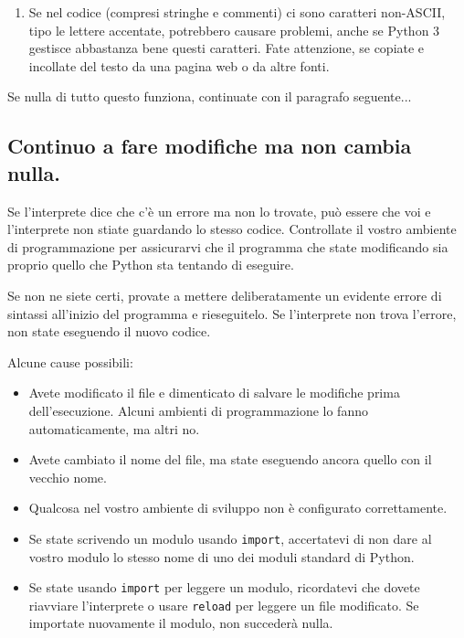 \documentclass[10pt]{book}
\begin{document}
\begin{enumerate}
\item Se nel codice (compresi stringhe e commenti) ci sono caratteri non-ASCII, tipo le lettere accentate, potrebbero causare problemi, anche se Python 3 gestisce abbastanza bene questi caratteri. Fate attenzione, se copiate e incollate del testo da una pagina web o da altre fonti.

\end{enumerate}

Se nulla di tutto questo funziona, continuate con il paragrafo seguente...


\subsection{Continuo a fare modifiche ma non cambia nulla.}

Se l'interprete dice che c'è un errore ma non lo trovate, può essere che voi e l'interprete non stiate guardando lo stesso codice. Controllate il vostro ambiente di programmazione per assicurarvi che il programma che state modificando sia proprio quello che Python sta tentando di eseguire.

Se non ne siete certi, provate a mettere deliberatamente un evidente errore di sintassi all'inizio del programma e rieseguitelo. Se l'interprete non trova l'errore, non state eseguendo il nuovo codice.

Alcune cause possibili:

\begin{itemize}

\item Avete modificato il file e dimenticato di salvare le modifiche prima dell'esecuzione. Alcuni ambienti di programmazione lo fanno automaticamente, ma altri no.

\item Avete cambiato il nome del file, ma state eseguendo ancora quello con il vecchio nome.

\item Qualcosa nel vostro ambiente di sviluppo non è configurato correttamente.

\item Se state scrivendo un modulo usando {\tt import}, accertatevi di non dare al vostro modulo lo stesso nome di uno dei moduli standard di Python.

\item Se state usando {\tt import} per leggere un modulo, ricordatevi che dovete riavviare l'interprete o usare {\tt reload} per leggere un file modificato. Se importate nuovamente il modulo, non succederà nulla.

\end{itemize}
\end{document}
